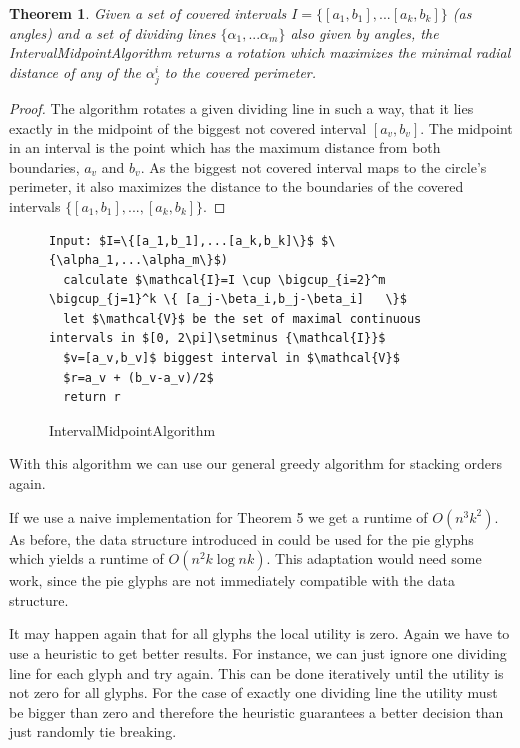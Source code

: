 \documentclass[a4paper,11pt]{article}
\newtheorem{theorem}{Theorem}
\begin{document}
\begin{theorem}
  Given a set of covered intervals $I=\{[a_1,b_1],...[a_k,b_k]\}$ (as angles) and a set of dividing lines $\{\alpha_1,...\alpha_m\}$ also given by angles, the IntervalMidpointAlgorithm returns a rotation which maximizes the minimal radial distance of any of the $\alpha^i_j$ to the covered perimeter.
\end{theorem}

\begin{proof}
  The algorithm rotates a given dividing line in such a way, that it lies exactly in the midpoint of the biggest not covered interval $[a_v, b_v]$. The midpoint in an interval is the point which has the maximum distance from both boundaries, $a_v$ and $b_v$. As the biggest not covered interval maps to the circle's perimeter, it also maximizes the distance to the boundaries of the covered intervals $\{[a_1, b_1], ..., [a_k, b_k]\}$.
\end{proof}

\begin{figure}[!bth]
  \begin{lstlisting}[mathescape=true ]
Input: $I=\{[a_1,b_1],...[a_k,b_k]\}$ $\{\alpha_1,...\alpha_m\}$)
  calculate $\mathcal{I}=I \cup \bigcup_{i=2}^m    \bigcup_{j=1}^k \{ [a_j-\beta_i,b_j-\beta_i]   \}$
  let $\mathcal{V}$ be the set of maximal continuous intervals in $[0, 2\pi]\setminus {\mathcal{I}}$
  $v=[a_v,b_v]$ biggest interval in $\mathcal{V}$
  $r=a_v + (b_v-a_v)/2$
  return r
  \end{lstlisting}
  \caption{IntervalMidpointAlgorithm}
\end{figure}

With this algorithm we can use our general greedy algorithm for stacking orders again.

If we use a naive implementation for Theorem 5 we get a runtime of $O(n^3k^2)$. As before, the data structure introduced in \cite{cabello} could be used for the pie glyphs which yields a runtime of $O(n^2k \log nk)$. This adaptation would need some work, since the pie glyphs are not immediately  compatible with the data structure.

It may happen again that for all glyphs the local utility is zero. Again we have to use a heuristic to get better results. For instance, we can just ignore one dividing line for each glyph and try again. This can be done iteratively until the utility is not zero for all glyphs. For the case of exactly one dividing line the utility must be bigger than zero and therefore the heuristic guarantees a better decision than just randomly tie breaking.
\end{document}
